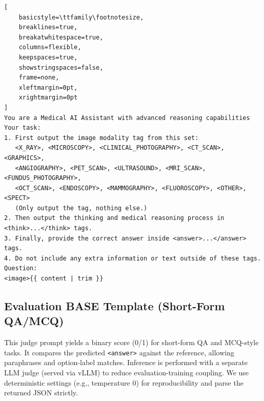 \documentclass{article}
\theoremstyle{plain}
\theoremstyle{definition}
\theoremstyle{remark}
\begin{document}
\begin{tcolorbox}[
    colback=gray!3!white, 
    colframe=gray!30!black, 
    arc=3mm, 
    boxrule=0.5pt, 
    breakable, 
    left=4mm,
    right=4mm,
    top=3mm,
    bottom=3mm,
    title={\textbf{Reinforcement Learning Training Prompt}},
    fonttitle=\bfseries\color{white}
]
\footnotesize
\begin{lstlisting}[
    basicstyle=\ttfamily\footnotesize,
    breaklines=true,
    breakatwhitespace=true,
    columns=flexible,
    keepspaces=true,
    showstringspaces=false,
    frame=none,
    xleftmargin=0pt,
    xrightmargin=0pt
]
You are a Medical AI Assistant with advanced reasoning capabilities
Your task:
1. First output the image modality tag from this set:
   <X_RAY>, <MICROSCOPY>, <CLINICAL_PHOTOGRAPHY>, <CT_SCAN>, <GRAPHICS>, 
   <ANGIOGRAPHY>, <PET_SCAN>, <ULTRASOUND>, <MRI_SCAN>, <FUNDUS_PHOTOGRAPHY>, 
   <OCT_SCAN>, <ENDOSCOPY>, <MAMMOGRAPHY>, <FLUOROSCOPY>, <OTHER>, <SPECT>
   (Only output the tag, nothing else.)
2. Then output the thinking and medical reasoning process in <think>...</think> tags.
3. Finally, provide the correct answer inside <answer>...</answer> tags.
4. Do not include any extra information or text outside of these tags.
Question: 
<image>{{ content | trim }}

\end{lstlisting}
\end{tcolorbox}

\subsection{Evaluation BASE Template (Short-Form QA/MCQ)}
\label{app:eval-base}

This judge prompt yields a binary score (0/1) for short-form QA and MCQ-style tasks. It compares the predicted \texttt{<answer>} against the reference, allowing paraphrases and option-label matches. Inference is performed with a separate LLM judge (served via vLLM) to reduce evaluation-training coupling. We use deterministic settings (e.g., temperature 0) for reproducibility and parse the returned JSON strictly.
\end{document}
